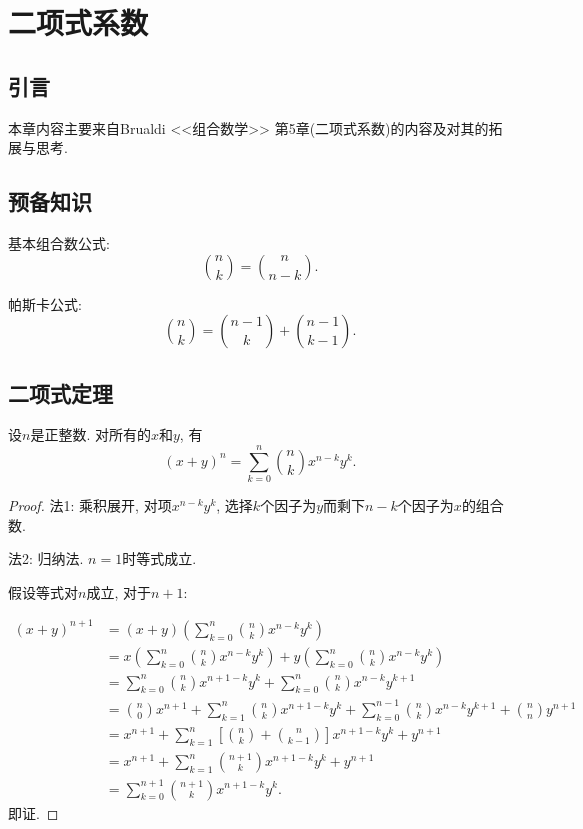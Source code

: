 \chapter{二项式系数}
\section*{引言}
本章内容主要来自Brualdi <<组合数学>> 第5章(二项式系数)的内容及对其的拓展与思考.
\section*{预备知识}
基本组合数公式: 
\[\binom{n}{k} = \binom{n}{n-k}.  \]

帕斯卡公式:
\[\binom{n}{k} = \binom{n-1}{k}+\binom{n-1}{k-1}.  \]

\section{二项式定理}
\begin{theorem}[二项式定理]
    设\(n\)是正整数.  对所有的\(x\)和\(y\),  有\[(x + y)^n = \sum_{k=0}^{n} \binom{n}{k} x^{n-k} y^k.  \]
\end{theorem}
\begin{proof}
    法1: 乘积展开, 对项\(x^{n-k}y^k\), 选择\(k\)个因子为\(y\)而剩下\(n-k\)个因子为\(x\)的组合数.

    法2: 归纳法.  \(n=1\)时等式成立.

    假设等式对\(n\)成立, 对于\(n+1\): 

    \begin{align*}
        (x + y)^{n+1} & = (x + y) \left( \sum_{k=0}^{n} \binom{n}{k} x^{n-k} y^k \right)                                                                          \\
                      & = x \left( \sum_{k=0}^{n} \binom{n}{k} x^{n-k} y^k \right) + y \left( \sum_{k=0}^{n} \binom{n}{k} x^{n-k} y^k \right)                     \\
                      & = \sum_{k=0}^{n} \binom{n}{k} x^{n+1-k} y^k + \sum_{k=0}^{n} \binom{n}{k} x^{n-k} y^{k+1}                                                 \\
                      & = \binom{n}{0} x^{n+1} + \sum_{k=1}^{n} \binom{n}{k} x^{n+1-k} y^k + \sum_{k=0}^{n-1} \binom{n}{k} x^{n-k} y^{k+1} + \binom{n}{n} y^{n+1} \\
                      & = x^{n+1} + \sum_{k=1}^{n} \left[ \binom{n}{k} + \binom{n}{k-1} \right] x^{n+1-k} y^k + y^{n+1}                                           \\
                      & =x^{n+1} + \sum_{k=1}^{n} \binom{n+1}{k} x^{n+1-k} y^k + y^{n+1}                                                                          \\
                      & =\sum_{k=0}^{n+1} \binom{n+1}{k} x^{n+1-k} y^k.
    \end{align*}
    即证.
\end{proof}

